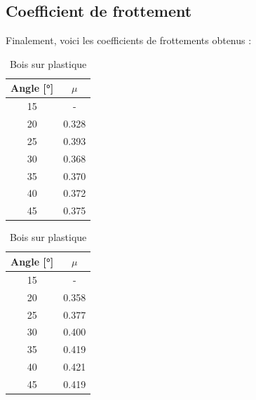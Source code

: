 \documentclass[twoside,twocolumn]{article}
\begin{document}
\subsection{Coefficient de frottement}
Finalement, voici les coefficients de frottements obtenus :
\begin{table}[H]
\centering
\caption{Bois sur bois}
\begin{tabular}{|c|c|}
\hline
Angle [°] &$\mu$ \\
           \hline   \hline
15        &- \\
           \hline
20        &0.328 \\
           \hline
25        &0.393 \\
           \hline
30        &0.368 \\
           \hline
35        &0.370 \\
           \hline
40        &0.372 \\
           \hline
45        &0.375 \\
           \hline
\end{tabular}
\label{table:coeffbb}

\caption{Bois sur plastique}
\begin{tabular}{|c|c|}
\hline
Angle [°] &$\mu$ \\
           \hline   \hline
15        &- \\
           \hline
20        &0.358 \\
           \hline
25        &0.377 \\
           \hline
30        &0.400 \\
           \hline
35        &0.419 \\
           \hline
40        &0.421 \\
           \hline
45        &0.419 \\
           \hline
\end{tabular}
\label{table:coeffbp}
\end{table}
\end{document}
